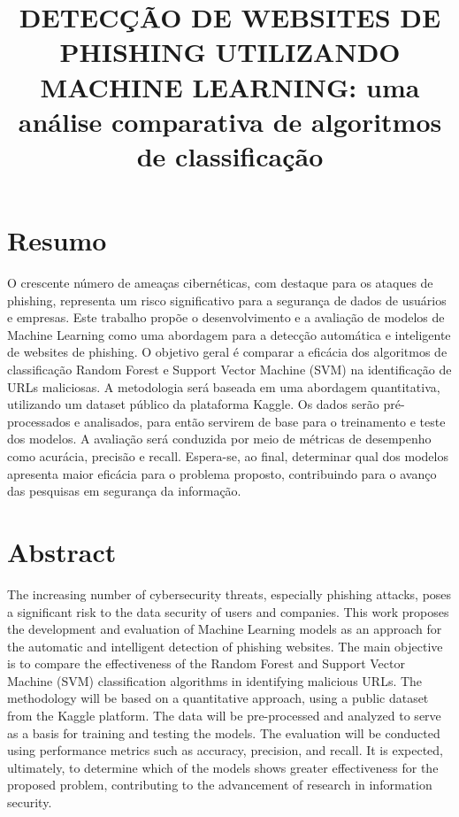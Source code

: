 \documentclass[12pt]{article}
\title{DETECÇÃO DE WEBSITES DE PHISHING UTILIZANDO MACHINE LEARNING: uma análise comparativa de algoritmos de classificação}
\begin{document}
\maketitle

\thispagestyle{plain}

\section*{Resumo}
\noindent O crescente número de ameaças cibernéticas, com destaque para os ataques de phishing, representa um risco significativo para a segurança de dados de usuários e empresas. Este trabalho propõe o desenvolvimento e a avaliação de modelos de Machine Learning como uma abordagem para a detecção automática e inteligente de websites de phishing. O objetivo geral é comparar a eficácia dos algoritmos de classificação Random Forest e Support Vector Machine (SVM) na identificação de URLs maliciosas. A metodologia será baseada em uma abordagem quantitativa, utilizando um dataset público da plataforma Kaggle. Os dados serão pré-processados e analisados, para então servirem de base para o treinamento e teste dos modelos. A avaliação será conduzida por meio de métricas de desempenho como acurácia, precisão e recall. Espera-se, ao final, determinar qual dos modelos apresenta maior eficácia para o problema proposto, contribuindo para o avanço das pesquisas em segurança da informação.


\section*{Abstract}
\noindent The increasing number of cybersecurity threats, especially phishing attacks, poses a significant risk to the data security of users and companies. This work proposes the development and evaluation of Machine Learning models as an approach for the automatic and intelligent detection of phishing websites. The main objective is to compare the effectiveness of the Random Forest and Support Vector Machine (SVM) classification algorithms in identifying malicious URLs. The methodology will be based on a quantitative approach, using a public dataset from the Kaggle platform. The data will be pre-processed and analyzed to serve as a basis for training and testing the models. The evaluation will be conducted using performance metrics such as accuracy, precision, and recall. It is expected, ultimately, to determine which of the models shows greater effectiveness for the proposed problem, contributing to the advancement of research in information security.
\end{document}
